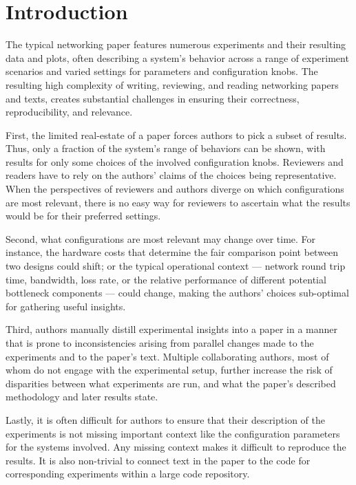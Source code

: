 \section{Introduction}

The typical networking paper features numerous experiments and their resulting data and plots, often describing a system's behavior across a range of experiment scenarios and varied settings for parameters and configuration knobs. The resulting high complexity of writing, reviewing, and reading networking papers and texts, creates substantial challenges in ensuring their correctness, reproducibility, and relevance. 

First, the limited real-estate of a paper forces authors to pick a subset of results. Thus, only a fraction of the system's range of behaviors can be shown, with results for only some choices of the involved configuration knobs. Reviewers and readers have to rely on the authors' claims of the choices being representative. When the perspectives of reviewers and authors diverge on which configurations are most relevant, there is no easy way for reviewers to ascertain what the results would be for their preferred settings.

Second, what configurations are most relevant may change over time. For instance, the hardware costs that determine the fair comparison point between two designs could shift; or the typical operational context --- network round trip time, bandwidth, loss rate, or the relative performance of different potential bottleneck components ---  could change, making the authors' choices sub-optimal for gathering useful insights.

Third, authors manually distill experimental insights into a paper in a manner that is prone to inconsistencies arising from parallel changes made to the experiments and to the paper's text. Multiple collaborating authors, most of whom do not engage with the experimental setup, further increase the risk of disparities between what experiments are run, and what the paper's described methodology and later results state.

Lastly, it is often difficult for authors to ensure that their description of the experiments is not missing important context like the configuration parameters for the systems involved. Any missing context makes it difficult to reproduce the results. It is also non-trivial to connect text in the paper to the code for corresponding experiments within a large code repository.

